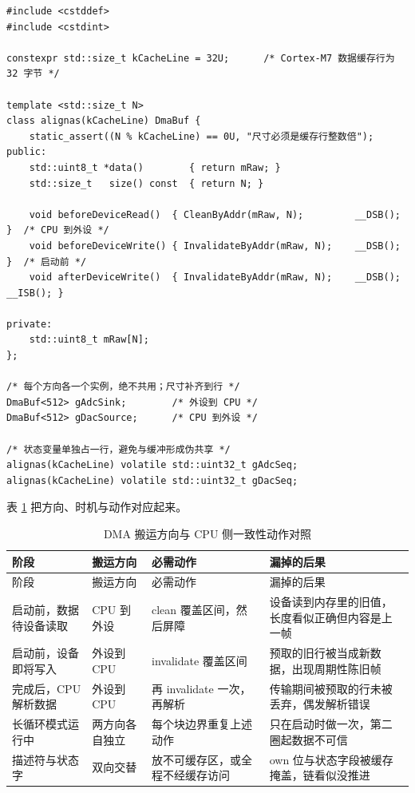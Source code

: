 \documentclass[12pt,a4paper,fontset=fandol]{ctexbook}
\begin{document}
\begin{lstlisting}[style=cppstyle,caption={C++：按缓存行对齐的 DMA 缓冲与一致性动作封装},label={lst:ch05-cache-aligned}]
#include <cstddef>
#include <cstdint>

constexpr std::size_t kCacheLine = 32U;      /* Cortex-M7 数据缓存行为 32 字节 */

template <std::size_t N>
class alignas(kCacheLine) DmaBuf {
    static_assert((N % kCacheLine) == 0U, "尺寸必须是缓存行整数倍");
public:
    std::uint8_t *data()        { return mRaw; }
    std::size_t   size() const  { return N; }

    void beforeDeviceRead()  { CleanByAddr(mRaw, N);         __DSB(); }  /* CPU 到外设 */
    void beforeDeviceWrite() { InvalidateByAddr(mRaw, N);    __DSB(); }  /* 启动前 */
    void afterDeviceWrite()  { InvalidateByAddr(mRaw, N);    __DSB(); __ISB(); }

private:
    std::uint8_t mRaw[N];
};

/* 每个方向各一个实例，绝不共用；尺寸补齐到行 */
DmaBuf<512> gAdcSink;        /* 外设到 CPU */
DmaBuf<512> gDacSource;      /* CPU 到外设 */

/* 状态变量单独占一行，避免与缓冲形成伪共享 */
alignas(kCacheLine) volatile std::uint32_t gAdcSeq;
alignas(kCacheLine) volatile std::uint32_t gDacSeq;
\end{lstlisting}

表 \ref{tab:ch05-cache-actions} 把方向、时机与动作对应起来。

\begin{longtable}{>{\raggedright\arraybackslash}p{} >{\raggedright\arraybackslash}p{} >{\raggedright\arraybackslash}p{} >{\raggedright\arraybackslash}p{}}
\caption{DMA 搬运方向与 CPU 侧一致性动作对照}\label{tab:ch05-cache-actions}\\
\toprule
阶段 & 搬运方向 & 必需动作 & 漏掉的后果 \\
\midrule
\endfirsthead
\toprule
阶段 & 搬运方向 & 必需动作 & 漏掉的后果 \\
\midrule
\endhead
\bottomrule
\endfoot
\endlastfoot
启动前，数据待设备读取 & CPU 到外设 & clean 覆盖区间，然后屏障 & 设备读到内存里的旧值，长度看似正确但内容是上一帧 \\
启动前，设备即将写入 & 外设到 CPU & invalidate 覆盖区间 & 预取的旧行被当成新数据，出现周期性陈旧帧 \\
完成后，CPU 解析数据 & 外设到 CPU & 再 invalidate 一次，再解析 & 传输期间被预取的行未被丢弃，偶发解析错误 \\
长循环模式运行中 & 两方向各自独立 & 每个块边界重复上述动作 & 只在启动时做一次，第二圈起数据不可信 \\
描述符与状态字 & 双向交替 & 放不可缓存区，或全程不经缓存访问 & own 位与状态字段被缓存掩盖，链看似没推进 \\
\end{longtable}
\end{document}
